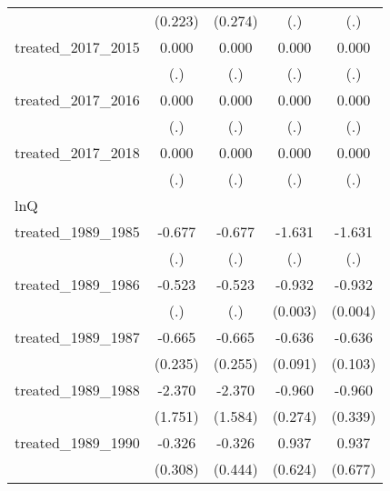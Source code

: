 {\begin{tabular}{l*{4}{c}}
            &     (0.223)         &     (0.274)         &         (.)         &         (.)         \\
[1em]
treated\_2017\_2015&       0.000         &       0.000         &       0.000         &       0.000         \\
            &         (.)         &         (.)         &         (.)         &         (.)         \\
[1em]
treated\_2017\_2016&       0.000         &       0.000         &       0.000         &       0.000         \\
            &         (.)         &         (.)         &         (.)         &         (.)         \\
[1em]
treated\_2017\_2018&       0.000         &       0.000         &       0.000         &       0.000         \\
            &         (.)         &         (.)         &         (.)         &         (.)         \\
\hline
lnQ         &                     &                     &                     &                     \\
treated\_1989\_1985&      -0.677         &      -0.677         &      -1.631         &      -1.631         \\
            &         (.)         &         (.)         &         (.)         &         (.)         \\
[1em]
treated\_1989\_1986&      -0.523         &      -0.523         &      -0.932\sym{***}&      -0.932\sym{***}\\
            &         (.)         &         (.)         &     (0.003)         &     (0.004)         \\
[1em]
treated\_1989\_1987&      -0.665\sym{**} &      -0.665\sym{**} &      -0.636\sym{***}&      -0.636\sym{***}\\
            &     (0.235)         &     (0.255)         &     (0.091)         &     (0.103)         \\
[1em]
treated\_1989\_1988&      -2.370         &      -2.370         &      -0.960\sym{***}&      -0.960\sym{**} \\
            &     (1.751)         &     (1.584)         &     (0.274)         &     (0.339)         \\
[1em]
treated\_1989\_1990&      -0.326         &      -0.326         &       0.937         &       0.937         \\
            &     (0.308)         &     (0.444)         &     (0.624)         &     (0.677)         \\

\end{tabular}}
